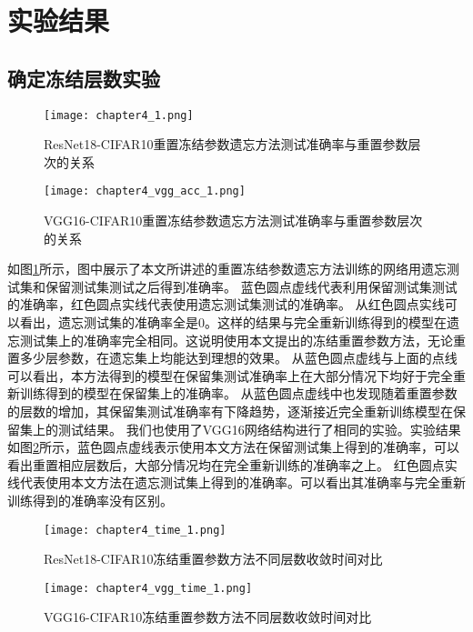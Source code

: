 \section{实验结果}
\subsection{确定冻结层数实验}
\begin{figure}
    \centering
    \texttt{[image: chapter4\_1.png]}
    \caption{ResNet18-CIFAR10重置冻结参数遗忘方法测试准确率与重置参数层次的关系}
    \label{fig:chapter4_1}
\end{figure}

\begin{figure}
    \centering
    \texttt{[image: chapter4\_vgg\_acc\_1.png]}
    \caption{VGG16-CIFAR10重置冻结参数遗忘方法测试准确率与重置参数层次的关系}
    \label{fig:chapter4_vgg_acc_1}
\end{figure}

如图\ref{fig:chapter4_1}所示，图中展示了本文所讲述的重置冻结参数遗忘方法训练的网络用遗忘测试集和保留测试集测试之后得到准确率。
蓝色圆点虚线代表利用保留测试集测试的准确率，红色圆点实线代表使用遗忘测试集测试的准确率。
从红色圆点实线可以看出，遗忘测试集的准确率全是0。这样的结果与完全重新训练得到的模型在遗忘测试集上的准确率完全相同。这说明使用本文提出的冻结重置参数方法，无论重置多少层参数，在遗忘集上均能达到理想的效果。
从蓝色圆点虚线与上面的点线可以看出，本方法得到的模型在保留集测试准确率上在大部分情况下均好于完全重新训练得到的模型在保留集上的准确率。
从蓝色圆点虚线中也发现随着重置参数的层数的增加，其保留集测试准确率有下降趋势，逐渐接近完全重新训练模型在保留集上的测试结果。
我们也使用了VGG16网络结构进行了相同的实验。实验结果如图\ref{fig:chapter4_vgg_acc_1}所示，蓝色圆点虚线表示使用本文方法在保留测试集上得到的准确率，可以看出重置相应层数后，大部分情况均在完全重新训练的准确率之上。
红色圆点实线代表使用本文方法在遗忘测试集上得到的准确率。可以看出其准确率与完全重新训练得到的准确率没有区别。

\begin{figure}
    \centering
    \texttt{[image: chapter4\_time\_1.png]}
    \caption{ResNet18-CIFAR10冻结重置参数方法不同层数收敛时间对比}
    \label{fig:chapter4_time_1}
\end{figure}

\begin{figure}
    \centering
    \texttt{[image: chapter4\_vgg\_time\_1.png]}
    \caption{VGG16-CIFAR10冻结重置参数方法不同层数收敛时间对比}
    \label{fig:chapter4_vgg_time_1}
\end{figure}

